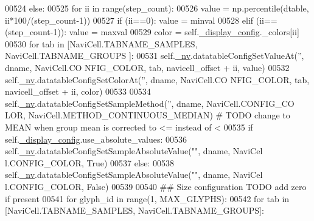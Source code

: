 \begin{DoxyCode}
00524             \textcolor{keywordflow}{else}:
00525                 \textcolor{keywordflow}{for} ii \textcolor{keywordflow}{in} range(step\_count):
00526                     value = np.percentile(dtable, ii*100/(step\_count-1))
00527                     \textcolor{keywordflow}{if} (ii==0): value = minval
00528                     \textcolor{keywordflow}{elif} (ii==(step\_count-1)): value = maxval
00529                     color = self.\hyperlink{classnavicom_1_1navicom_1_1NaviCom_ab8ddca454f674629472d8bfec46ac76f}{_display_config}.\_colors[ii]
00530                     \textcolor{keywordflow}{for} tab \textcolor{keywordflow}{in} [NaviCell.TABNAME\_SAMPLES, NaviCell.TABNAME\_GROUPS
      ]:
00531                         self.\hyperlink{classnavicom_1_1navicom_1_1NaviCom_afff3fd56fa16a68bab52ba8d801e325a}{_nv}.datatableConfigSetValueAt(\textcolor{stringliteral}{''}, dname, NaviCell.CO
      NFIG\_COLOR, tab, navicell\_offset + ii, value)
00532                         self.\hyperlink{classnavicom_1_1navicom_1_1NaviCom_afff3fd56fa16a68bab52ba8d801e325a}{_nv}.datatableConfigSetColorAt(\textcolor{stringliteral}{''}, dname, NaviCell.CO
      NFIG\_COLOR, tab, navicell\_offset + ii, color)
00533 
00534             self.\hyperlink{classnavicom_1_1navicom_1_1NaviCom_afff3fd56fa16a68bab52ba8d801e325a}{_nv}.datatableConfigSetSampleMethod(\textcolor{stringliteral}{''}, dname, NaviCell.CONFIG\_CO
      LOR, NaviCell.METHOD\_CONTINUOUS\_MEDIAN) \textcolor{comment}{# TODO change to MEAN when group mean is 
      corrected to <= instead of <}
00535             \textcolor{keywordflow}{if} self.\hyperlink{classnavicom_1_1navicom_1_1NaviCom_ab8ddca454f674629472d8bfec46ac76f}{_display_config}.use\_absolute\_values:
00536                 self.\hyperlink{classnavicom_1_1navicom_1_1NaviCom_afff3fd56fa16a68bab52ba8d801e325a}{_nv}.datatableConfigSetSampleAbsoluteValue(\textcolor{stringliteral}{""}, dname, NaviCel
      l.CONFIG\_COLOR, \textcolor{keyword}{True})
00537             \textcolor{keywordflow}{else}:
00538                 self.\hyperlink{classnavicom_1_1navicom_1_1NaviCom_afff3fd56fa16a68bab52ba8d801e325a}{_nv}.datatableConfigSetSampleAbsoluteValue(\textcolor{stringliteral}{""}, dname, NaviCel
      l.CONFIG\_COLOR, \textcolor{keyword}{False})
00539 
00540             \textcolor{comment}{## Size configuration TODO add zero if present}
00541             \textcolor{keywordflow}{for} glyph\_id \textcolor{keywordflow}{in} range(1, MAX\_GLYPHS):
00542                 \textcolor{keywordflow}{for} tab \textcolor{keywordflow}{in} [NaviCell.TABNAME\_SAMPLES, NaviCell.TABNAME\_GROUPS]:

\end{DoxyCode}
